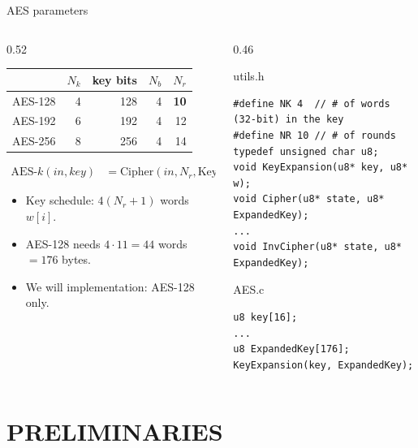 \documentclass[aspectratio=169,10pt]{beamer}
\newcommand{\fn}[1]{\mathrm{#1}}
\newcommand{\Nr}{N_{r}}
\newcommand{\Nk}{N_{k}}
\newcommand{\Nb}{N_{b}}
\begin{document}
\begin{frame}[fragile]{AES parameters}
\begin{columns}[T]
\begin{column}{0.52\textwidth}
\centering\footnotesize
\begin{tabular}{@{}lrrrr@{}}
\toprule
 & $\Nk$ & key bits & $\Nb$ & $\Nr$ \\
\midrule
AES-128 & 4 & 128 & 4 & \textbf{10} \\
AES-192 & 6 & 192 & 4 & 12 \\
AES-256 & 8 & 256 & 4 & 14 \\
\bottomrule
\end{tabular}
\vskip8pt
\raggedright\small
\begin{align*}
\fn{AES\text{-}}k(\mathit{in},\mathit{key}) &= \fn{Cipher}(\mathit{in},\Nr,\fn{KeyExpansion}(\mathit{key}))
\end{align*}
\begin{itemize}\footnotesize
\item Key schedule: $4(\Nr+1)$ words $w[i]$.
\item AES-128 needs $4\cdot 11=44$ words $=176$ bytes.
\item We will implementation: \alert{AES-128 only}.
\end{itemize}
\end{column}
\begin{column}{0.46\textwidth}
\begin{tbox}{utils.h}
\begin{lstlisting}
#define NK 4  // # of words (32-bit) in the key
#define NR 10 // # of rounds
typedef unsigned char u8;
void KeyExpansion(u8* key, u8* w);
void Cipher(u8* state, u8* ExpandedKey);
...
void InvCipher(u8* state, u8* ExpandedKey);
\end{lstlisting}
\end{tbox}
\vskip4pt
\begin{tbox}{AES.c}
\begin{lstlisting}
u8 key[16];
...
u8 ExpandedKey[176];
KeyExpansion(key, ExpandedKey);
\end{lstlisting}
\end{tbox}
\end{column}
\end{columns}
\end{frame}

\section{PRELIMINARIES}
\end{document}
